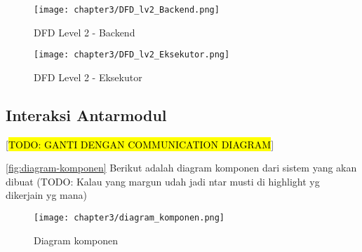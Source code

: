 \begin{figure}[H]
  \centering
  \texttt{[image: chapter3/DFD\_lv2\_Backend.png]}
  \caption{DFD Level 2 - Backend} \label{fig:dfd-lv2-backend}
\end{figure}

\begin{figure}[H]
  \centering
  \texttt{[image: chapter3/DFD\_lv2\_Eksekutor.png]}
  \caption{DFD Level 2 - Eksekutor} \label{fig:dfd-lv2-eksekutor}
\end{figure}

\blindtext

\subsection{Interaksi Antarmodul}
[\hl{TODO: GANTI DENGAN COMMUNICATION DIAGRAM}]

\autoref{fig:diagram-komponen} Berikut adalah diagram komponen dari sistem yang akan dibuat (TODO: Kalau yang margun udah jadi ntar musti di highlight yg dikerjain yg mana)

\begin{figure}[H]
  \centering
  \texttt{[image: chapter3/diagram\_komponen.png]}
  \caption{Diagram komponen} \label{fig:diagram-komponen}
\end{figure}

\blindtext